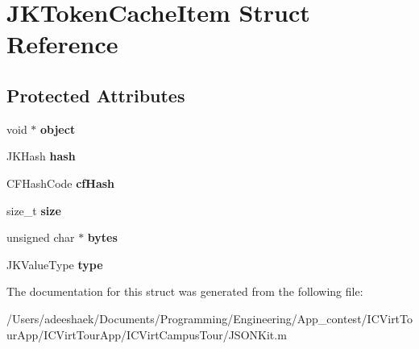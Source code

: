 \hypertarget{struct_j_k_token_cache_item}{\section{J\-K\-Token\-Cache\-Item Struct Reference}
\label{struct_j_k_token_cache_item}
}
\subsection*{Protected Attributes}
\begin{DoxyCompactItemize}
\item 
\hypertarget{struct_j_k_token_cache_item_a077376d12464f945e2414d5499c79b3f}{void $\ast$ {\bfseries object}}\label{struct_j_k_token_cache_item_a077376d12464f945e2414d5499c79b3f}

\item 
\hypertarget{struct_j_k_token_cache_item_addce7a2236a6d63fc138c0cf539efed8}{J\-K\-Hash {\bfseries hash}}\label{struct_j_k_token_cache_item_addce7a2236a6d63fc138c0cf539efed8}

\item 
\hypertarget{struct_j_k_token_cache_item_a0cc23a992e2dfec16fab2317759014e0}{C\-F\-Hash\-Code {\bfseries cf\-Hash}}\label{struct_j_k_token_cache_item_a0cc23a992e2dfec16fab2317759014e0}

\item 
\hypertarget{struct_j_k_token_cache_item_a854352f53b148adc24983a58a1866d66}{size\-\_\-t {\bfseries size}}\label{struct_j_k_token_cache_item_a854352f53b148adc24983a58a1866d66}

\item 
\hypertarget{struct_j_k_token_cache_item_a4ed0df40a586c13fea61e803e2d60f13}{unsigned char $\ast$ {\bfseries bytes}}\label{struct_j_k_token_cache_item_a4ed0df40a586c13fea61e803e2d60f13}

\item 
\hypertarget{struct_j_k_token_cache_item_a7401008a86730d488fb6c94f068cffe6}{J\-K\-Value\-Type {\bfseries type}}\label{struct_j_k_token_cache_item_a7401008a86730d488fb6c94f068cffe6}

\end{DoxyCompactItemize}


The documentation for this struct was generated from the following file\-:\begin{DoxyCompactItemize}
\item 
/\-Users/adeeshaek/\-Documents/\-Programming/\-Engineering/\-App\-\_\-contest/\-I\-C\-Virt\-Tour\-App/\-I\-C\-Virt\-Tour\-App/\-I\-C\-Virt\-Campus\-Tour/J\-S\-O\-N\-Kit.\-m\end{DoxyCompactItemize}
